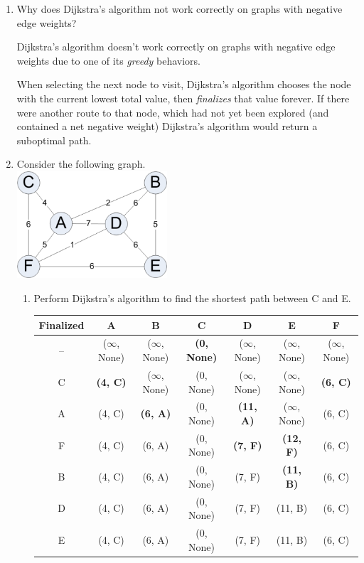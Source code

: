 \documentclass[11pt]{article}
\newenvironment{answer}{\large\lstset{basicstyle=\tiny\ttfamily}\color{white} }{}
\newenvironment{answer}{\large\lstset{basicstyle=\large\ttfamily}\color{red} }{}
\newcommand{\answerrow}[1]{\hline \rowfont{\color{white}} #1}
\newcommand{\answerrow}[1]{\hline \rowfont{\color{red}} #1}
\begin{document}
\begin{enumerate}
\item Why does Dijkstra's algorithm not work correctly on graphs with negative
      edge weights?

\begin{answer}
Dijkstra's algorithm doesn't work correctly on graphs with negative edge
weights due to one of its {\em greedy} behaviors.

When selecting the next node to visit, Dijkstra's algorithm chooses the
node with the current lowest total value, then {\em finalizes} that value
forever. If there were another route to that node, which had not yet been
explored (and contained a net negative weight) Dijkstra's algorithm would
return a suboptimal path.
\end{answer}


\item
Consider the following graph. \\
\includegraphics[height=150px]{graph}
\begin{enumerate}
\item
Perform Dijkstra's algorithm to find the shortest path between C and E. \\
\def\arraystretch{1.65}
\begin{tabu}{| c | c | c | c | c | c | c |}
\hline
Finalized & A & B & C & D & E & F\\
\hline
-- & ($\infty$, None) & ($\infty$, None) & \textbf{(0, None)} & ($\infty$, None) & ($\infty$, None) & ($\infty$, None) \\
\answerrow{C & \textbf{(4, C)} & ($\infty$, None) & (0, None) & ($\infty$, None) & ($\infty$, None) & \textbf{(6, C)}} \\
\answerrow{A & (4, C) & \textbf{(6, A)} & (0, None) & \textbf{(11, A)} & ($\infty$, None) & (6, C)} \\
\answerrow{F & (4, C) & (6, A) & (0, None) & \textbf{(7, F)} & \textbf{(12, F)} & (6, C)} \\
\answerrow{B & (4, C) & (6, A) & (0, None) & (7, F) & \textbf{(11, B)} & (6, C)} \\
\answerrow{D & (4, C) & (6, A) & (0, None) & (7, F) & (11, B) & (6, C)} \\
\answerrow{E & (4, C) & (6, A) & (0, None) & (7, F) & (11, B) & (6, C)} \\
\hline
\end{tabu} \\


\end{enumerate}
\end{enumerate}
\end{document}

